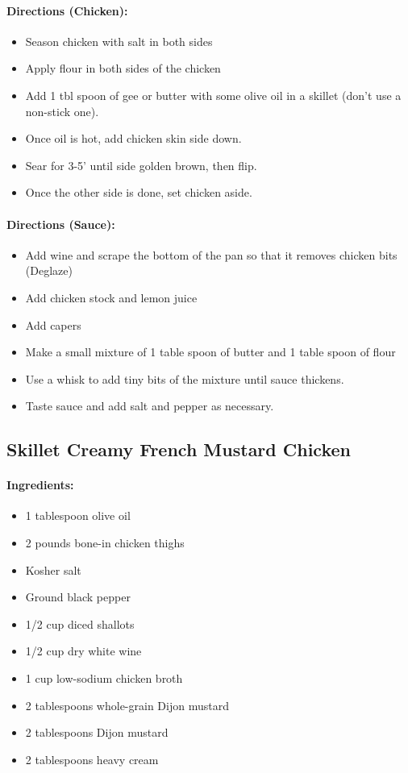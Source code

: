 \documentclass{article}
\begin{document}
\paragraph{Directions (Chicken):}
\begin{itemize}
	\item Season chicken with salt in both sides
	\item Apply flour in both sides of the chicken
	\item Add 1 tbl spoon of gee or butter with some olive oil in a skillet (don't use a non-stick one).
	\item Once oil is hot, add chicken skin side down.
	\item Sear for 3-5' until side golden brown, then flip.
	\item Once the other side is done, set chicken aside.
\end{itemize}

\paragraph{Directions (Sauce):}
\begin{itemize}
	\item Add wine and scrape the bottom of the pan so that it removes chicken bits (Deglaze)
	\item Add chicken stock and lemon juice
	\item Add capers
	\item Make a small mixture of 1 table spoon of butter and 1 table spoon of flour
	\item Use a whisk to add tiny bits of the mixture until sauce thickens.
	\item Taste sauce and add salt and pepper as necessary.
\end{itemize}

\subsection{Skillet Creamy French Mustard Chicken}

\paragraph{Ingredients:}
\begin{itemize}
	\item 1 tablespoon olive oil
	\item 2 pounds bone-in chicken thighs
	\item Kosher salt
	\item Ground black pepper
	\item 1/2 cup diced shallots
	\item 1/2 cup dry white wine
	\item 1 cup low-sodium chicken broth
	\item 2 tablespoons whole-grain Dijon mustard
	\item 2 tablespoons Dijon mustard
	\item 2 tablespoons heavy cream	
\end{itemize}
\end{document}
